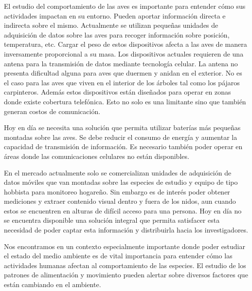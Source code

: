 %

%


El estudio del comportamiento de las aves es importante para entender cómo sus actividades impactan en su entorno. Pueden aportar información directa e indirecta sobre el mismo. Actualmente se utilizan pequeñas unidades de adquisición de datos sobre las aves para recoger información sobre posición, temperatura, etc. 
Cargar el peso de estos dispositivos afecta a las aves de manera inversamente proporcional a su masa. Los dispositivos actuales requieren de una antena para la transmisión de datos mediante tecnología celular. La antena no presenta dificultad alguna para aves que duermen y anidan en el exterior. No es el caso para las aves que viven en el interior de los árboles tal como los pájaros carpinteros. Además estos dispositivos están diseñados para operar en zonas donde existe cobertura telefónica. Esto no solo es una limitante sino que también generan costos de comunicación.

Hoy en día se necesita una solución que permita utilizar baterías más pequeñas montadas sobre las aves. Se debe reducir el consumo de energía y aumentar la capacidad de transmisión de información. Es necesario también poder operar en áreas donde las comunicaciones celulares no están disponibles.

En el mercado actualmente solo se comercializan unidades de adquisición de datos móviles que van montadas sobre las especies de estudio y equipo de tipo hobbista para monitoreo hogareño. Sin embargo es de interés poder obtener mediciones y extraer contenido visual dentro y fuera de los nidos, aun cuando estos se encuentren en alturas de difícil acceso para una persona. Hoy en día no se encuentra disponible una solución integral que permita satisfacer esta necesidad de poder captar esta información y distribuirla hacia los investigadores.


Nos encontramos en un contexto especialmente importante donde poder estudiar el estado del medio ambiente es de vital importancia para entender cómo las actividades humanas afectan al comportamiento de las especies. El estudio de los patrones de alimentación y movimiento pueden alertar sobre diversos factores que están cambiando en el ambiente.  


%